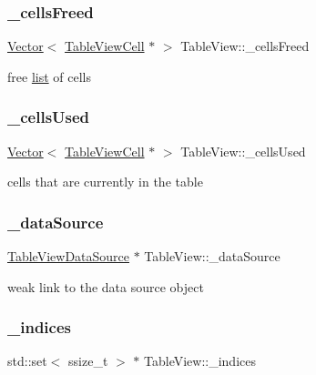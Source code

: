 \subsubsection{\texorpdfstring{\+\_\+cells\+Freed}{\_cellsFreed}}
{\footnotesize\ttfamily \hyperlink{classVector}{Vector}$<$ \hyperlink{classTableViewCell}{Table\+View\+Cell} $\ast$ $>$ Table\+View\+::\+\_\+cells\+Freed\hspace{0.3cm}{\ttfamily [protected]}}

free \hyperlink{protocollist-p}{list} of cells \mbox{\label{classTableView_aa3996f96046814cc6fca417ea794dac1}} 
\subsubsection{\texorpdfstring{\+\_\+cells\+Used}{\_cellsUsed}}
{\footnotesize\ttfamily \hyperlink{classVector}{Vector}$<$ \hyperlink{classTableViewCell}{Table\+View\+Cell} $\ast$ $>$ Table\+View\+::\+\_\+cells\+Used\hspace{0.3cm}{\ttfamily [protected]}}

cells that are currently in the table \mbox{\label{classTableView_a2b8ece22aaa72b09778f4b82adb75cbf}} 
\subsubsection{\texorpdfstring{\+\_\+data\+Source}{\_dataSource}}
{\footnotesize\ttfamily \hyperlink{classTableViewDataSource}{Table\+View\+Data\+Source} $\ast$ Table\+View\+::\+\_\+data\+Source\hspace{0.3cm}{\ttfamily [protected]}}

weak link to the data source object \mbox{\label{classTableView_ade6d803003ab47ae75cf86e8fffeb313}} 
\subsubsection{\texorpdfstring{\+\_\+indices}{\_indices}}
{\footnotesize\ttfamily std\+::set$<$ ssize\+\_\+t $>$ $\ast$ Table\+View\+::\+\_\+indices\hspace{0.3cm}{\ttfamily [protected]}}

